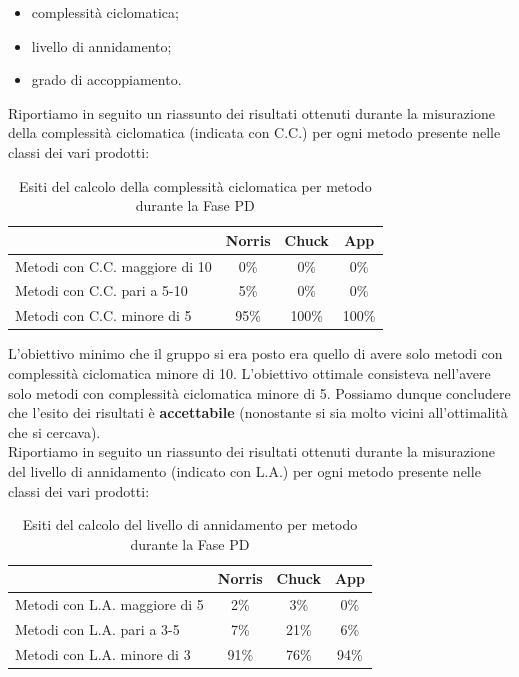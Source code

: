 				\begin{itemize}
					\item complessità ciclomatica;
					\item livello di annidamento;
					\item grado di accoppiamento.
				\end{itemize}
				Riportiamo in seguito un riassunto dei risultati ottenuti durante la misurazione della complessità ciclomatica (indicata con C.C.) per ogni metodo presente nelle classi dei vari prodotti:
				\begin{table}[H]
					\centering
					\begin{tabu}{| l | c | c | c |}
						\hline
						                                 & Norris   & Chuck   & App     \\ \hline \hline
						Metodi con C.C. maggiore di 10   & 0\%      & 0\%     & 0\%     \\ \hline
						Metodi con C.C. pari a 5-10      & 5\%      & 0\%     & 0\%     \\ \hline
						Metodi con C.C. minore di 5      & 95\%     & 100\%   & 100\%   \\ \hline
					\end{tabu}
					\caption{Esiti del calcolo della complessità ciclomatica per metodo durante la Fase PD}
				\end{table}
				L'obiettivo minimo che il gruppo si era posto era quello di avere solo metodi con complessità ciclomatica minore di 10. L'obiettivo ottimale consisteva nell'avere solo metodi con complessità ciclomatica minore di 5. Possiamo dunque concludere che l'esito dei risultati è \textbf{accettabile} (nonostante si sia molto vicini all'ottimalità che si cercava).\\
				Riportiamo in seguito un riassunto dei risultati ottenuti durante la misurazione del livello di annidamento (indicato con L.A.) per ogni metodo presente nelle classi dei vari prodotti:
				\begin{table}[H]
					\centering
					\begin{tabu}{| l | c | c | c |}
						\hline
						                                & Norris   & Chuck   & App     \\ \hline \hline
						Metodi con L.A. maggiore di 5   & 2\%      & 3\%     & 0\%     \\ \hline
						Metodi con L.A. pari a 3-5      & 7\%     & 21\%    & 6\%     \\ \hline
						Metodi con L.A. minore di 3     & 91\%     & 76\%    & 94\%   \\ \hline
					\end{tabu}
					\caption{Esiti del calcolo del livello di annidamento per metodo durante la Fase PD}
				\end{table}
